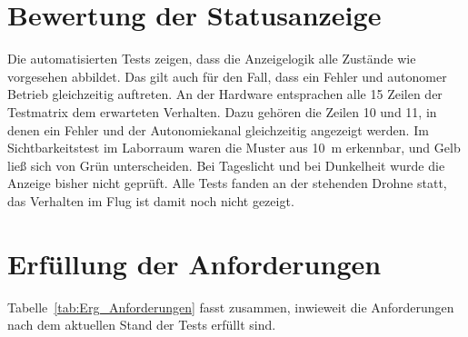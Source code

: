     \section{Bewertung der Statusanzeige}
    \label{sec:Diskussion_LED}

    Die automatisierten Tests zeigen, dass die Anzeigelogik alle Zustände wie vorgesehen abbildet.
    Das gilt auch für den Fall, dass ein Fehler und autonomer Betrieb gleichzeitig auftreten.
    An der Hardware entsprachen alle 15 Zeilen der Testmatrix dem erwarteten Verhalten.
    Dazu gehören die Zeilen 10 und 11, in denen ein Fehler und der Autonomiekanal gleichzeitig angezeigt werden.
    Im Sichtbarkeitstest im Laborraum waren die Muster aus \SI{10}{\metre} erkennbar, und Gelb ließ sich von Grün
    unterscheiden.
    Bei Tageslicht und bei Dunkelheit wurde die Anzeige bisher nicht geprüft.
    Alle Tests fanden an der stehenden Drohne statt, das Verhalten im Flug ist damit noch nicht gezeigt.

    \section{Erfüllung der Anforderungen}
    \label{sec:Diskussion_Anforderungen}

    Tabelle~\ref{tab:Erg_Anforderungen} fasst zusammen, inwieweit die Anforderungen nach dem aktuellen Stand der Tests
    erfüllt sind.

